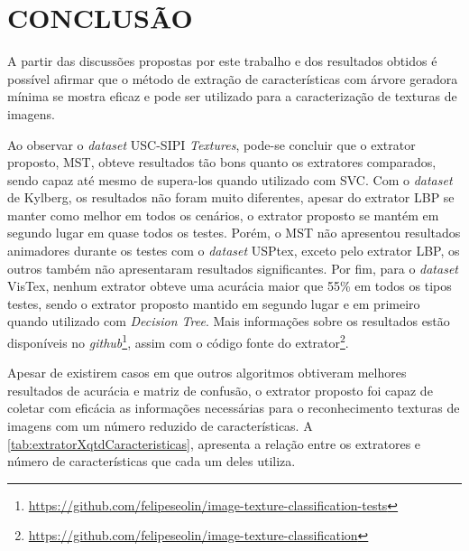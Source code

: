 \chapter{CONCLUSÃO}
\label{chap:conclusao}

\par A partir das discussões propostas por este trabalho e dos resultados obtidos é possível afirmar que o método de extração de características com árvore geradora mínima se mostra eficaz e pode ser utilizado para a caracterização de texturas de imagens.

\par Ao observar o \textit{dataset} USC-SIPI \textit{Textures}, pode-se concluir que o extrator proposto, MST, obteve resultados tão bons quanto os extratores comparados, sendo capaz até mesmo de supera-los quando utilizado com SVC. Com o \textit{dataset} de Kylberg, os resultados não foram muito diferentes, apesar do extrator LBP se manter como melhor em todos os cenários, o extrator proposto se mantém em segundo lugar em quase todos os testes. Porém, o MST não apresentou resultados animadores durante os testes com o \textit{dataset} USPtex, exceto pelo extrator LBP, os outros também não apresentaram resultados significantes. Por fim, para o \textit{dataset} VisTex, nenhum extrator obteve uma acurácia maior que 55\% em todos os tipos testes, sendo o extrator proposto mantido em segundo lugar e em primeiro quando utilizado com \textit{Decision Tree}. Mais informações sobre os resultados estão disponíveis no \textit{github}\footnote{\url{https://github.com/felipeseolin/image-texture-classification-tests}}, assim com o código fonte do extrator\footnote{\url{https://github.com/felipeseolin/image-texture-classification}}.

\par Apesar de existirem casos em que outros algoritmos obtiveram melhores resultados de acurácia e matriz de confusão, o extrator proposto foi capaz de coletar com eficácia as informações necessárias para o reconhecimento texturas de imagens com um número reduzido de características. A \autoref{tab:extratorXqtdCaracteristicas}, apresenta a relação entre os extratores e número de características que cada um deles utiliza.




